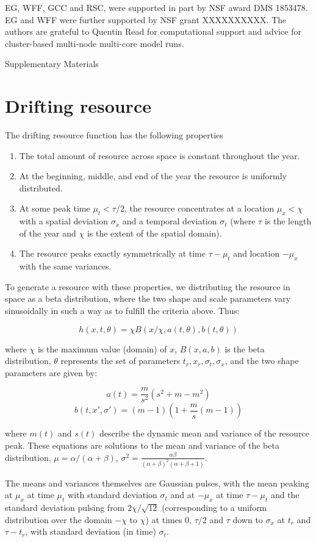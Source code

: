 \documentclass[12pt]{article}
\begin{document}
EG, WFF, GCC and RSC, were supported in part by NSF award DMS 1853478. EG and WFF were further supported by NSF grant XXXXXXXXXX. The authors are grateful to Quentin Read for computational support and advice for cluster-based multi-node multi-core model runs. 

\nolinenumbers



\linenumbers

\clearpage
\begin{center}
	\Large Supplementary Materials
	\end{center}

\normalsize
\appendix
\section{Drifting resource}
The drifting resource function has the following properties

\begin{enumerate}
\item The total amount of resource across space is constant throughout the year.
\item At the beginning, middle, and end of the year the resource is uniformly distributed. 
\item At some peak time $\mu_t < \tau/2$, the resource concentrates at a location $\mu_x < \chi$ with a spatial deviation $\sigma_x$ and a temporal deviation $\sigma_t$ (where $\tau$ is the length of the year and $\chi$ is the extent of the spatial domain).
\item The resource peaks exactly symmetrically at time $\tau - \mu_t$ and location $-\mu_x$ with the same variances.
\end{enumerate}

To generate a resource with these properties, we distributing the resource in space as a beta distribution, where the two shape and scale parameters vary sinusoidally in such a way as to fulfill the criteria above.  Thus:

$$h(x,t, \theta) = \chi B(x/\chi, a(t, \theta), b(t, \theta))$$

where $\chi$ is the maximum value (domain) of $x$, $B(x, a, b)$ is the beta distribution, $\theta$ represents the set of parameters $t_r, x_r, \sigma_t, \sigma_x$, and the two shape parameters are given by:

$$a(t) = \frac{m}{s^2}( s^2 + m - m^2)$$
$$b(t, x', \sigma') = (m-1)\left(1 + \frac{m}{s}(m-1)\right) $$

where $m(t)$ and $s(t)$ describe the dynamic mean and variance of the resource peak.  These equations are solutions to the mean and variance of the beta distribution, $\mu = \alpha/(\alpha + \beta)$, $\sigma^2 = \frac{\alpha\beta}{(\alpha+\beta)^2(\alpha+\beta+1)}$.

The means and variances themselves are Gaussian pulses, with the mean peaking at $\mu_x$ at time $\mu_t$ with standard deviation $\sigma_t$ and at $-\mu_x$ at time $\tau - \mu_t$ and the standard deviation pulsing from $2 \chi/\sqrt{12}$ (corresponding to a uniform distribution over the domain $-\chi$ to $\chi$) at times 0, $\tau/2$ and $\tau$ down to $\sigma_x$ at $t_r$ and $\tau - t_r$, with standard deviation (in time) $\sigma_t$. 
\end{document}
